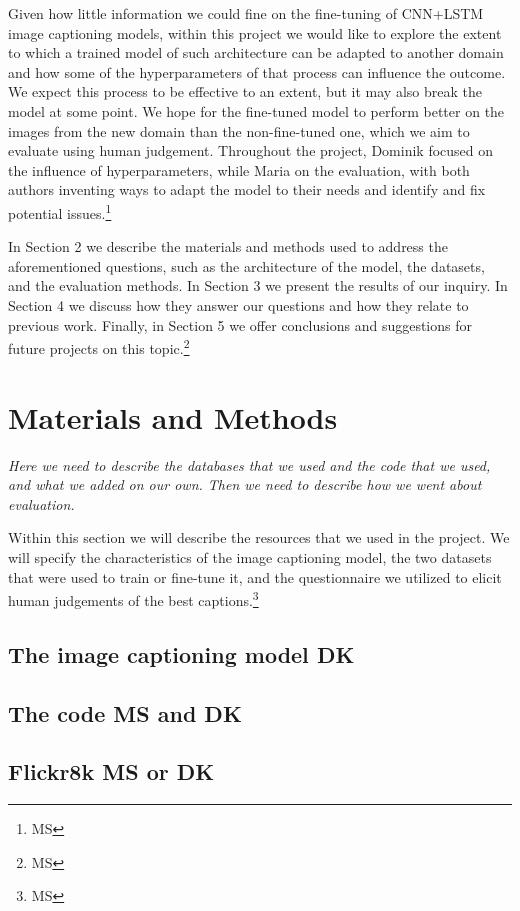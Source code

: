 \documentclass[11pt]{article}
\begin{document}
Given how little information we could fine on the fine-tuning of CNN+LSTM image captioning models, within this project we would like to explore the extent to which a trained model of such architecture can be adapted to another domain and how some of the hyperparameters of that process can influence the outcome. We expect this process to be effective to an extent, but it may also break the model at some point. We hope for the fine-tuned model to perform better on the images from the new domain than the non-fine-tuned one, which we aim to evaluate using human judgement. Throughout the project, Dominik focused on the influence of hyperparameters, while Maria on the evaluation, with both authors inventing ways to adapt the model to their needs and identify and fix potential issues.\footnote{MS} 

In Section 2 we describe the materials and methods used to address the aforementioned questions, such as the architecture of the model, the datasets, and the evaluation methods. In Section 3 we present the results of our inquiry. In Section 4 we discuss how they answer our questions and how they relate to previous work. Finally, in Section 5 we offer conclusions and suggestions for future projects on this topic.\footnote{MS}

\section{Materials and Methods}

\textit{Here we need to describe the databases that we used and the code that we used, and what we added on our own. Then we need to describe how we went about evaluation.}

Within this section we will describe the resources that we used in the project. We will specify the characteristics of the image captioning model, the two datasets that were used to train or fine-tune it, and the questionnaire we utilized to elicit human judgements of the best captions.\footnote{MS}

\subsection{The image captioning model \textbf{DK}}
\subsection{The code \textbf{MS and DK}}
\subsection{Flickr8k \textbf{MS or DK}}
\end{document}
